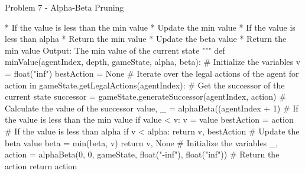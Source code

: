 \begin{problem}{Problem 7 - Alpha-Beta Pruning}
\begin{highlight}[Solution]
\begin{code}[Python]
                    * If the value is less than the min value
                    * Update the min value
                    * If the value is less than alpha
                    * Return the min value
                    * Update the beta value
                * Return the min value
                Output:
                The min value of the current state
        """
        def minValue(agentIndex, depth, gameState, alpha, beta):
            # Initialize the variables
            v = float("inf")
            bestAction = None
            # Iterate over the legal actions of the agent
            for action in gameState.getLegalActions(agentIndex):
                # Get the successor of the current state
                successor = gameState.generateSuccessor(agentIndex, action)
                # Calculate the value of the successor
                value, _ = alphaBeta((agentIndex + 1) %
                # If the value is less than the min value
                if value < v:
                    v = value
                    bestAction = action
                # If the value is less than alpha
                if v < alpha:
                    return v, bestAction
                # Update the beta value
                beta = min(beta, v)
            return v, None
        # Initialize the variables
        _, action = alphaBeta(0, 0, gameState, float("-inf"), float("inf"))
        # Return the action
        return action
    \end{code}
    \end{highlight}
\end{problem}

